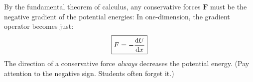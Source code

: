 By the fundamental theorem of calculus, any conservative forces $\bm F$
must be the negative gradient of the potential energies:
In one-dimension, the gradient operator becomes just:
\begin{equation}
  \boxed{
    F=-\diff Ux
  }
\end{equation}
The direction of a conservative force \emph{always} decreases the potential
energy. (Pay attention to the negative sign. Students often forget it.)



%
%

